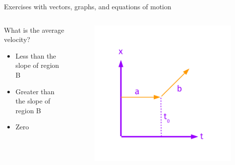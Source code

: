 \documentclass{beamer}
\begin{document}
\begin{frame}{Exercises with vectors, graphs, and equations of motion}
\begin{columns}[T]
\begin{column}{0.4\textwidth}
\small
What is the average velocity?
\begin{itemize}
\item Less than the slope of region B
\item Greater than the slope of region B
\item Zero
\end{itemize}
\end{column}
\begin{column}{0.6\textwidth}
\begin{figure}
\centering
\includegraphics[width=\textwidth,trim=0cm 0cm 0cm 1.5cm,clip=true]{figures/Vectors3.pdf}
\end{figure}
\end{column}
\end{columns}
\end{frame}
\end{document}
